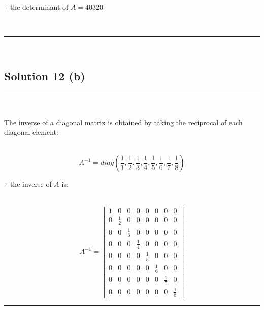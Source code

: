 \documentclass{article}
\begin{document}
\parbox{\textwidth}{$\therefore$ the determinant of $A= 40320$}\\

\noindent\rule{\textwidth}{0.4pt}\\
\newpage
\subsection*{Solution 12 (b)}
\noindent\rule{\textwidth}{0.4pt}\\

\parbox{\textwidth}{The inverse of a diagonal matrix is obtained by taking the reciprocal of each diagonal element:}\\
$$A^{-1} = diag\left(\frac{1}{1}, \frac{1}{2}, \frac{1}{3}, \frac{1}{4}, \frac{1}{5}, \frac{1}{6}, \frac{1}{7}, \frac{1}{8}\right)$$

\parbox{\textwidth}{$\therefore$ the inverse of $A$ is:}\\
$$A^{-1} = \begin{bmatrix}
    1 & 0 & 0 & 0 & 0 & 0 & 0 & 0 \\
    0 & \frac{1}{2} & 0 & 0 & 0 & 0 & 0 & 0 \\
    0 & 0 & \frac{1}{3} & 0 & 0 & 0 & 0 & 0 \\
    0 & 0 & 0 & \frac{1}{4} & 0 & 0 & 0 & 0 \\
    0 & 0 & 0 & 0 & \frac{1}{5} & 0 & 0 & 0 \\
    0 & 0 & 0 & 0 & 0 & \frac{1}{6} & 0 & 0 \\
    0 & 0 & 0 & 0 & 0 & 0 & \frac{1}{7} & 0 \\
    0 & 0 & 0 & 0 & 0 & 0 & 0 & \frac{1}{8}
\end{bmatrix}$$
\noindent\rule{\textwidth}{0.4pt}\\
\newpage
\end{document}
